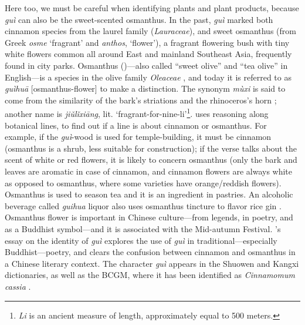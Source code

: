 Here too, we must be careful when identifying plants and plant products, because \textit{guì} can also be the sweet-scented osmanthus. In the past, \textit{guì} marked both cinnamon species from the laurel family (\textit{Lauraceae}), and sweet osmanthus (from Greek \textit{osme} `fragrant' and \textit{anthos}, `flower'), a fragrant flowering bush with tiny white flowers common all around East and mainland Southeast Asia, frequently found in city parks. Osmanthus ()---also called ``sweet olive'' and ``tea olive'' in English---is a species in the olive family \textit{Oleaceae} \autocite[191]{pearlstine_scent_2022}, and today it is referred to as  \textit{guìhuā} [osmanthus-flower] to make a distinction. The synonym  \textit{mùxi} is said to come from the similarity of the bark's striations and the rhinoceros's horn \autocite{chennault_reclusive_2006}; another name is  \textit{jiǔlǐxiāng}, lit. `fragrant-for-nine-li'\footnote{\textit{Li} is an ancient measure of length, approximately equal to 500 meters.}. \textcite{chennault_reclusive_2006} uses reasoning along botanical lines, to find out if a line is about cinnamon or osmanthus. For example, if the \textit{guì}-wood is used for temple-building, it must be cinnamon (osmanthus is a shrub, less suitable for construction); if the verse talks about the scent of white or red flowers, it is likely to concern osmanthus (only the bark and leaves are aromatic in case of cinnamon, and cinnamon flowers are always white as opposed to osmanthus, where some varieties have orange/reddish flowers). Osmanthus is used to season tea and it is an ingredient in pastries. An alcoholic beverage called \textit{guihua} liquor also uses osmanthus tincture to flavor rice gin \autocite[627]{hu_food_2005}. Osmanthus flower is important in Chinese culture---from legends, in poetry, and as a Buddhist symbol---and it is associated with the Mid-autumn Festival. \textcite{chennault_reclusive_2006}'s essay on the identity of \textit{guì} explores the use of \textit{guì} in traditional---especially Buddhist---poetry, and clears the confusion between cinnamon and osmanthus in a Chinese literary context. The character  \textit{guì} appears in the \gls{Shuowen} and \gls{Kangxi} dictionaries, as well as the \gls{BCGM}, where it has been identified as \textit{Cinnamomum cassia} \autocite[732]{zhang_dictionary_2015}.


